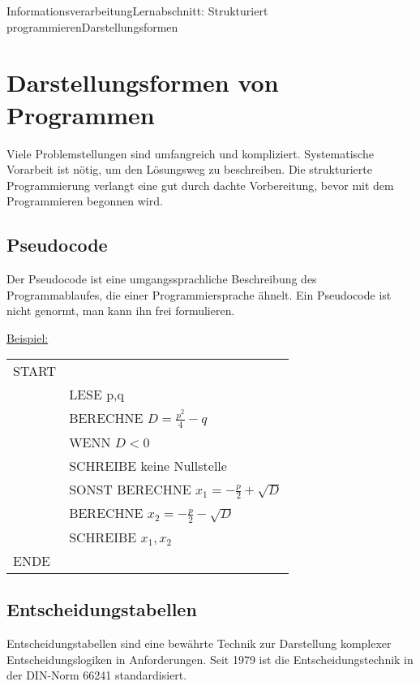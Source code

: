 \documentclass[11pt,oneside,openany,headings=optiontotoc,11pt,numbers=noenddot]{article}
\begin{document}
	\begin{worksheet}{Informationsverarbeitung}{Lernabschnitt: Strukturiert programmieren}{Darstellungsformen}
		\setlength{\columnseprule}{0pt}
		\setcounter{section}{2}
		\setcounter{page}{6}
		\noindent
		\section{Darstellungsformen von Programmen}
		Viele Problemstellungen sind umfangreich und kompliziert. Systematische Vorarbeit ist nötig, um den Lösungsweg zu beschreiben. Die strukturierte Programmierung verlangt eine gut durch dachte Vorbereitung, bevor mit dem Programmieren begonnen wird.
		\subsection{Pseudocode}
		Der Pseudocode ist eine umgangssprachliche Beschreibung des Programmablaufes, die einer Programmiersprache ähnelt. Ein Pseudocode ist nicht genormt, man kann ihn frei formulieren.
		\begin{framed}
			\noindent
			\underline{Beispiel:}\\
			\begin{itshape}
				\begin{tabularx}{\textwidth}{lX}
					START\\
					& LESE p,q\\
					& BERECHNE \(D = \frac{p^2}{4} - q\)\\
					& WENN \(D < 0\)\\
					& SCHREIBE \grqq{}keine Nullstelle\grqq{}\\
					& SONST BERECHNE \(x_1 = -\frac{p}{2} + \sqrt{D}\)\\
					& BERECHNE \(x_2 = -\frac{p}{2} - \sqrt{D}\)\\
					& SCHREIBE \(x_1, x_2\)\\
					ENDE
				\end{tabularx}
			\end{itshape}
		\end{framed}
		\subsection{Entscheidungstabellen}
		Entscheidungstabellen sind eine bewährte Technik zur Darstellung komplexer Entscheidungslogiken in Anforderungen. Seit 1979 ist die Entscheidungstechnik in der DIN-Norm 66241 standardisiert.

\end{worksheet}
\end{document}
